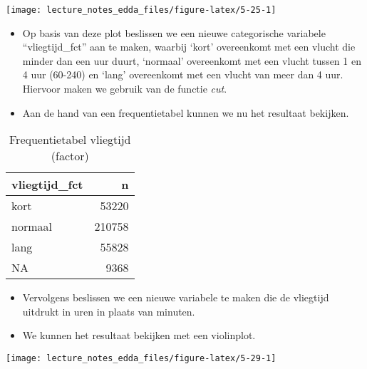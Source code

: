 \documentclass[]{memoir}
\newenvironment{Shaded}{\begin{snugshade}}{\end{snugshade}}
\newcommand{\KeywordTok}[1]{\textcolor[rgb]{0.13,0.29,0.53}{\textbf{#1}}}
\newcommand{\DataTypeTok}[1]{\textcolor[rgb]{0.13,0.29,0.53}{#1}}
\newcommand{\DecValTok}[1]{\textcolor[rgb]{0.00,0.00,0.81}{#1}}
\newcommand{\StringTok}[1]{\textcolor[rgb]{0.31,0.60,0.02}{#1}}
\newcommand{\OperatorTok}[1]{\textcolor[rgb]{0.81,0.36,0.00}{\textbf{#1}}}
\newcommand{\NormalTok}[1]{#1}
\providecommand{\tightlist}{%
  \setlength{\itemsep}{0pt}\setlength{\parskip}{0pt}}
\begin{document}
\texttt{[image: lecture\_notes\_edda\_files/figure-latex/5-25-1]}

\begin{itemize}
\item
  Op basis van deze plot beslissen we een nieuwe categorische variabele
  ``vliegtijd\_fct'' aan te maken, waarbij `kort' overeenkomt met een
  vlucht die minder dan een uur duurt, `normaal' overeenkomt met een
  vlucht tussen 1 en 4 uur (60-240) en `lang' overeenkomt met een vlucht
  van meer dan 4 uur. Hiervoor maken we gebruik van de functie
  \emph{cut}.
\item
  Aan de hand van een frequentietabel kunnen we nu het resultaat
  bekijken.
\end{itemize}

\begin{table}[t]

\caption{\label{tab:5-27b}Frequentietabel vliegtijd (factor)}
\centering
\fontsize{10}{12}\selectfont
\begin{tabular}{lr}
\toprule
vliegtijd\_fct & n\\
\midrule
kort & 53220\\
normaal & 210758\\
lang & 55828\\
NA & 9368\\
\bottomrule
\end{tabular}
\end{table}

\begin{itemize}
\tightlist
\item
  Vervolgens beslissen we een nieuwe variabele te maken die de vliegtijd
  uitdrukt in uren in plaats van minuten.
\end{itemize}

\begin{Shaded}
\end{Shaded}

\begin{itemize}
\tightlist
\item
  We kunnen het resultaat bekijken met een violinplot.
\end{itemize}

\texttt{[image: lecture\_notes\_edda\_files/figure-latex/5-29-1]}
\end{document}

